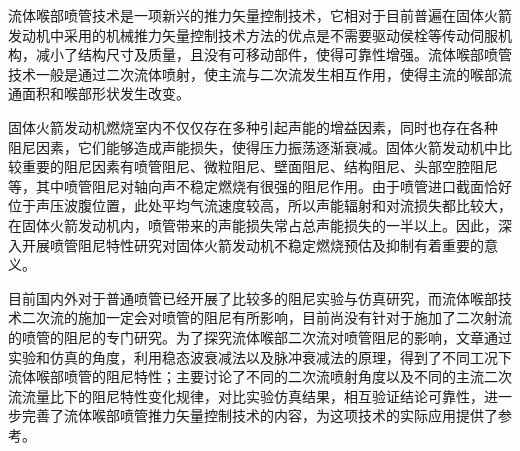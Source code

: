 \begin{zhabstract}
 流体喉部喷管技术是一项新兴的推力矢量控制技术，它相对于目前普遍在固体火箭发动机中采用的机械推力矢量控制技术方法的优点是不需要驱动侯栓等传动伺服机构，减小了结构尺寸及质量，且没有可移动部件，使得可靠性增强。流体喉部喷管技术一般是通过二次流体喷射，使主流与二次流发生相互作用，使得主流的喉部流通面积和喉部形状发生改变。
 
 固体火箭发动机燃烧室内不仅仅存在多种引起声能的增益因素，同时也存在各种
 阻尼因素，它们能够造成声能损失，使得压力振荡逐渐衰减。固体火箭发动机中比较重要的阻尼因素有喷管阻尼、微粒阻尼、壁面阻尼、结构阻尼、头部空腔阻尼等，其中喷管阻尼对轴向声不稳定燃烧有很强的阻尼作用。由于喷管进口截面恰好位于声压波腹位置，此处平均气流速度较高，所以声能辐射和对流损失都比较大，在固体火箭发动机内，喷管带来的声能损失常占总声能损失的一半以上。因此，深入开展喷管阻尼特性研究对固体火箭发动机不稳定燃烧预估及抑制有着重要的意义。
 
 目前国内外对于普通喷管已经开展了比较多的阻尼实验与仿真研究，而流体喉部技术二次流的施加一定会对喷管的阻尼有所影响，目前尚没有针对于施加了二次射流的喷管的阻尼的专门研究。为了探究流体喉部二次流对喷管阻尼的影响，文章通过实验和仿真的角度，利用稳态波衰减法以及脉冲衰减法的原理，得到了不同工况下流体喉部喷管的阻尼特性；主要讨论了不同的二次流喷射角度以及不同的主流二次流流量比下的阻尼特性变化规律，对比实验仿真结果，相互验证结论可靠性，进一步完善了流体喉部喷管推力矢量控制技术的内容，为这项技术的实际应用提供了参考。
 
\end{zhabstract}


